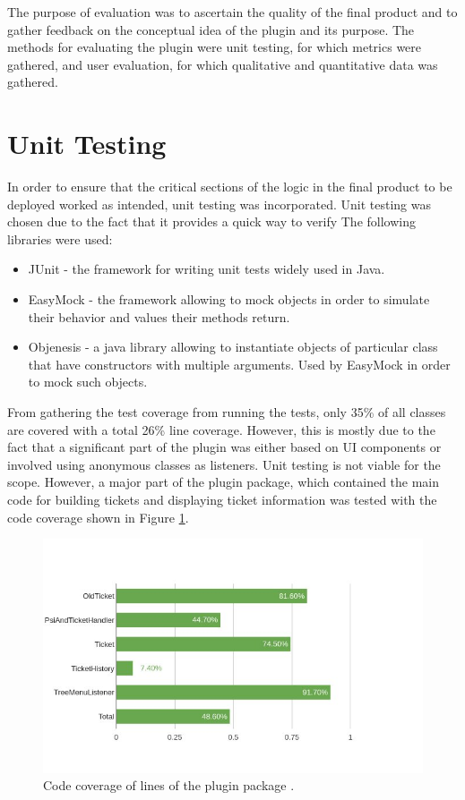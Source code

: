 \documentclass{4thYearProject}
\begin{document}
The purpose of evaluation was to ascertain the quality of the final product and to gather feedback on the conceptual idea of the plugin and its purpose. The methods for evaluating the plugin were unit testing, for which metrics were gathered, and user evaluation, for which qualitative and quantitative data was gathered.

\section{Unit Testing}

In order to ensure that the critical sections of the logic in the final product to be deployed worked as intended, unit testing was incorporated. Unit testing was chosen due to the fact that it provides a quick way to verify   The following libraries were used:

\begin{itemize}
\item JUnit - the framework for writing unit tests widely used in Java.
\item EasyMock - the framework allowing to mock objects in order to simulate their behavior and values their methods return. 
\item Objenesis - a java library allowing to instantiate objects of particular class that have constructors with multiple arguments. Used by EasyMock in order to mock such objects.
\end{itemize}

From gathering the test coverage from running the tests, only 35\% of all classes are covered with a total 26\% line coverage. However, this is mostly due to the fact that a significant part of the plugin was either based on UI components or involved using anonymous classes as listeners. Unit testing is not viable for the scope. However, a major part of the plugin package, which contained the main code for building tickets and displaying ticket information was tested with the code coverage shown in Figure \ref{fig:codecoveragelines}.
 
\begin{figure}[H]
\includegraphics[scale=0.7]{code_coverage_lines}
\centering
\caption{Code coverage of lines of the plugin package .}
\label{fig:codecoveragelines}
\end{figure}
\end{document}
